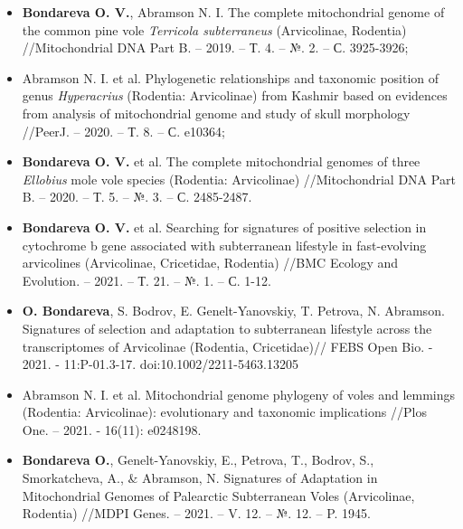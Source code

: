 \begin{itemize} 
	\item[\textbullet] \textbf{Bondareva O. V.}, Abramson N. I. The complete mitochondrial genome of the common pine vole \textit{Terricola subterraneus} (Arvicolinae, Rodentia) //Mitochondrial DNA Part B. – 2019. – Т. 4. – №. 2. – С. 3925-3926;
	\item[\textbullet] Abramson N. I. et al. Phylogenetic relationships and taxonomic position of genus \textit{Hyperacrius} (Rodentia: Arvicolinae) from Kashmir based on evidences from analysis of mitochondrial genome and study of skull morphology //PeerJ. – 2020. – Т. 8. – С. e10364;
	\item[\textbullet]\textbf{ Bondareva O. V.} et al. The complete mitochondrial genomes of three \textit{Ellobius} mole vole species (Rodentia: Arvicolinae) //Mitochondrial DNA Part B. – 2020. – Т. 5. – №. 3. – С. 2485-2487. 
	\item[\textbullet] \textbf{Bondareva O. V.} et al. Searching for signatures of positive selection in cytochrome b gene associated with subterranean lifestyle in fast-evolving arvicolines (Arvicolinae, Cricetidae, Rodentia) //BMC Ecology and Evolution. – 2021. – Т. 21. – №. 1. – С. 1-12.
	\item[\textbullet] \textbf{O. Bondareva}, S. Bodrov, E. Genelt-Yanovskiy, T. Petrova, N. Abramson. Signatures of selection and adaptation to subterranean lifestyle across the transcriptomes of Arvicolinae (Rodentia, Cricetidae)// FEBS Open Bio. - 2021. - 11:P-01.3-17. doi:10.1002/2211-5463.13205
	\item[\textbullet] Abramson N. I. et al. Mitochondrial genome phylogeny of voles and lemmings (Rodentia: Arvicolinae): evolutionary and taxonomic implications //Plos One. – 2021. - 16(11): e0248198.
	\item[\textbullet]  \textbf{Bondareva O.}, Genelt-Yanovskiy, E., Petrova, T., Bodrov, S., Smorkatcheva, A., \& Abramson, N.  Signatures of Adaptation in Mitochondrial Genomes of Palearctic Subterranean Voles (Arvicolinae, Rodentia) //MDPI Genes. – 2021. – V. 12. – №. 12. – P. 1945.
\end{itemize}



